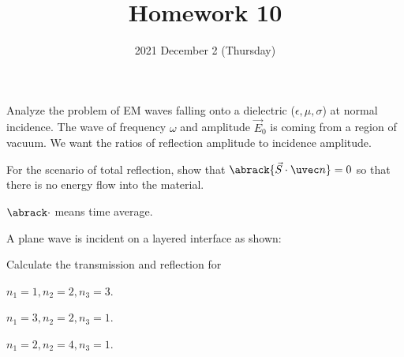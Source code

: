 \documentclass{phys151}
\title{Homework 10}
\author{}
\date{2021 December 2 (Thursday)}
\begin{document}
  
\begin{problem}
  Analyze the problem of EM waves falling onto a dielectric (\(\epsilon, \mu,
  \sigma\)) at normal incidence.  The wave of frequency \(\omega\) and
  amplitude \(\vec E_0\) is coming from a region of vacuum.  We want the ratios
  of reflection amplitude to incidence amplitude.
\end{problem}

\begin{solution}
  
\end{solution}

\begin{problem}
  For the scenario of total reflection, show that \(\abrack{\vec S \cdot \uvec
  n} = 0\) so that there is no energy flow into the material.

  \begin{note}
    \(\abrack\cdot\) means time average.
  \end{note}
\end{problem}

\begin{solution}
  
\end{solution}

\begin{problem}
  A plane wave is incident on a layered interface as shown:
  \begin{center}
  \end{center}

  Calculate the transmission and reflection for
  \begin{subproblems}
    \item \(n_1=1, n_2=2, n_3=3\).
    \item \(n_1=3, n_2=2, n_3=1\).
    \item \(n_1=2, n_2=4, n_3=1\).
  \end{subproblems}
\end{problem}
\end{document}
